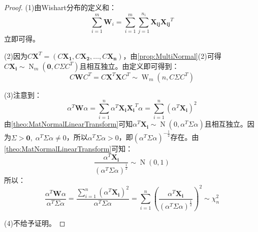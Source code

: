 \begin{proof}
	(1)由Wishart分布的定义和：
	\begin{equation*}
		\sum_{i=1}^{m}\mathbf{W}_i=\sum_{i=1}^{m}\sum_{j=1}^{n_i}\mathbf{X_{ij}}\mathbf{X_{ij}}^T
	\end{equation*}
	立即可得。\par
	(2)因为$C\mathbf{X}^T=(C\mathbf{X_1},C\mathbf{X_2},\dots,C\mathbf{X_n})$，由\cref{prop:MultiNormal}(2)可得$C\mathbf{X_i}\sim\operatorname{N}_m(\mathbf{0},C\Sigma C^T)$且相互独立。由定义即可得到：
	\begin{equation*}
		C\mathbf{W}C^T=C\mathbf{X}^T\mathbf{X}C^T\sim\operatorname{W}_m(n,C\Sigma C^T)
	\end{equation*}\par
	(3)注意到：
	\begin{equation*}
		\alpha^T\mathbf{W}\alpha=\sum_{i=1}^{n}\alpha^T\mathbf{X_i}\mathbf{X_i}^T\alpha=\sum_{i=1}^{n}(\alpha^T\mathbf{X_i})^2
	\end{equation*}
	由\cref{theo:MatNormalLinearTransform}可知$\alpha^T\mathbf{X_i}\sim\operatorname{N}(0,\alpha^T\Sigma\alpha)$且相互独立。因为$\Sigma>\mathbf{0},\;\alpha^T\Sigma\alpha\ne0$，所以$\alpha^T\Sigma\alpha>0$，即$(\alpha^T\Sigma\alpha)^{-\frac{1}{2}}$存在。由\cref{theo:MatNormalLinearTransform}可知：
	\begin{equation*}
		\frac{\alpha^T\mathbf{X_i}}{(\alpha^T\Sigma\alpha)^{\frac{1}{2}}}\sim\operatorname{N}(0,1)
	\end{equation*}
	所以：
	\begin{equation*}
		\frac{\alpha^T\mathbf{W}\alpha}{\alpha^T\Sigma\alpha}=\frac{\sum\limits_{i=1}^{n}(\alpha^T\mathbf{X_i})^2}{\alpha^T\Sigma\alpha}=\sum_{i=1}^{n}\left(\frac{\alpha^T\mathbf{X_i}}{(\alpha^T\Sigma\alpha)^{\frac{1}{2}}}\right)^2\sim\chi_n^2
	\end{equation*}\par
	(4)不给予证明。
\end{proof}

